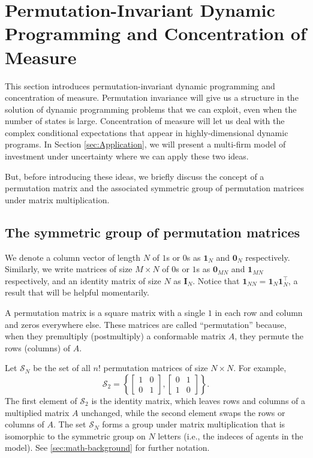 \documentclass[12pt]{article}
\begin{document}
\section{Permutation-Invariant Dynamic Programming and Concentration of Measure}\label{sec:classic-investment}

This section introduces permutation-invariant dynamic programming and concentration of measure. Permutation invariance will give us a structure in the solution of dynamic programming problems that we can exploit, even when the number of states is large. Concentration of measure will let us deal with the complex conditional expectations that appear in highly-dimensional dynamic programs. In Section \ref{sec:Application}, we will present a multi-firm model of investment under uncertainty where we can apply these two ideas.

But, before introducing these ideas, we briefly discuss the concept of a permutation matrix and the associated symmetric group of permutation matrices under matrix multiplication. 

\subsection{The symmetric group of permutation matrices}\label{sec:symmetric-group}

We denote a column vector of length $N$ of $1$s or $0$s as $\mathbf{1}_{N}$ and $\mathbf{0}_{N}$ respectively. Similarly, we write matrices of size $M\times N$ of $0$s or $1$s as $\mathbf{0}_{MN}$ and $\mathbf{1}_{MN}$ respectively, and an identity matrix of size $N$ as $\mathbf{I}_N$. Notice that $\mathbf{1}_{NN} = \mathbf{1}_N \mathbf{1}_N^{\top}$, a result that will be helpful momentarily.

A permutation matrix is a square matrix with a single $1$ in each row and column and zeros everywhere else. These matrices are called ``permutation'' because, when they premultiply (postmultiply) a conformable matrix $A$, they permute the rows (columns) of $A$. 

Let $\mathcal{S}_N$ be the set of all $n!$ permutation matrices of size $N \times N$. For example,
\begin{equation*}
\mathcal{S}_2 = \left\{ \begin{bmatrix}1 & 0 \\ 0 & 1\end{bmatrix},  \begin{bmatrix}0 & 1 \\ 1 & 0\end{bmatrix}\right\}.
\end{equation*}
The first element of $\mathcal{S}_2$ is the identity matrix, which leaves rows and columns of a multiplied matrix $A$ unchanged, while the second element swaps the rows or columns of $A$. The set $\mathcal{S}_N$ forms a group under matrix multiplication that is isomorphic to the symmetric group on $N$ letters (i.e., the indeces of agents in the model). See \cref{sec:math-background} for further notation.
\end{document}
